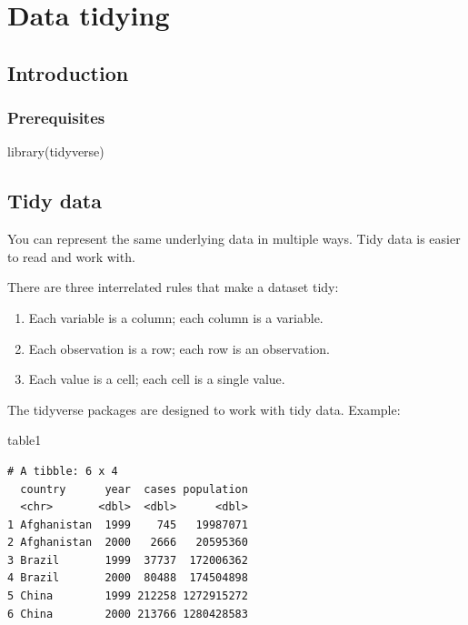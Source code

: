 \documentclass[
  letterpaper,
  DIV=11,
  numbers=noendperiod]{scrreprt}
\newenvironment{Shaded}{\begin{snugshade}}{\end{snugshade}}
\newcommand{\FunctionTok}[1]{\textcolor[rgb]{0.28,0.35,0.67}{#1}}
\newcommand{\NormalTok}[1]{\textcolor[rgb]{0.00,0.23,0.31}{#1}}
\providecommand{\tightlist}{%
  \setlength{\itemsep}{0pt}\setlength{\parskip}{0pt}}
\begin{document}
\chapter{Data tidying}\label{sec-data-tidying}

\section{Introduction}\label{introduction-2}

\subsection{Prerequisites}\label{prerequisites-1}

\begin{Shaded}
\begin{Highlighting}[]
\FunctionTok{library}\NormalTok{(tidyverse)}
\end{Highlighting}
\end{Shaded}

\section{Tidy data}\label{tidy-data}

You can represent the same underlying data in multiple ways. Tidy data
is easier to read and work with.

There are three interrelated rules that make a dataset tidy:

\begin{enumerate}
\def\labelenumi{\arabic{enumi}.}
\tightlist
\item
  Each variable is a column; each column is a variable.
\item
  Each observation is a row; each row is an observation.
\item
  Each value is a cell; each cell is a single value.
\end{enumerate}

The tidyverse packages are designed to work with tidy data. Example:

\begin{Shaded}
\begin{Highlighting}[]
\NormalTok{table1}
\end{Highlighting}
\end{Shaded}

\begin{verbatim}
# A tibble: 6 x 4
  country      year  cases population
  <chr>       <dbl>  <dbl>      <dbl>
1 Afghanistan  1999    745   19987071
2 Afghanistan  2000   2666   20595360
3 Brazil       1999  37737  172006362
4 Brazil       2000  80488  174504898
5 China        1999 212258 1272915272
6 China        2000 213766 1280428583
\end{verbatim}
\end{document}
